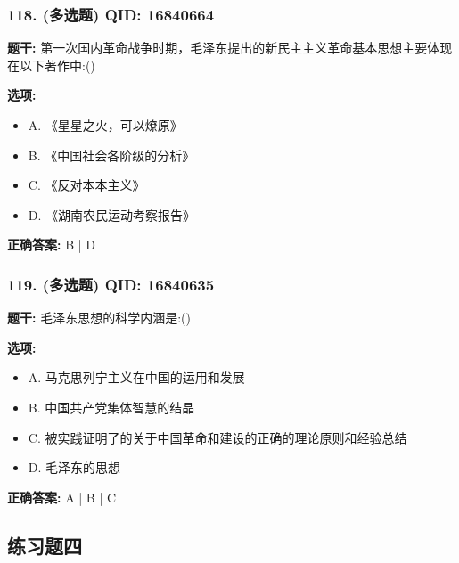 \documentclass[12pt,UTF8]{ctexart}
\begin{document}
\subsubsection*{118. (多选题) \small QID: 16840664}

\textbf{题干:}
第一次国内革命战争时期，毛泽东提出的新民主主义革命基本思想主要体现在以下著作中:()

\textbf{选项:}
\begin{itemize}[leftmargin=*]

  \item A. 《星星之火，可以燎原》

  \item B. 《中国社会各阶级的分析》

  \item C. 《反对本本主义》

  \item D. 《湖南农民运动考察报告》

\end{itemize}

\textbf{正确答案:}
B | D

\vspace{0.3em}\hrulefill\vspace{0.7em}

\subsubsection*{119. (多选题) \small QID: 16840635}

\textbf{题干:}
毛泽东思想的科学内涵是:()

\textbf{选项:}
\begin{itemize}[leftmargin=*]

  \item A. 马克思列宁主义在中国的运用和发展

  \item B. 中国共产党集体智慧的结晶

  \item C. 被实践证明了的关于中国革命和建设的正确的理论原则和经验总结

  \item D. 毛泽东的思想

\end{itemize}

\textbf{正确答案:}
A | B | C

\vspace{0.3em}\hrulefill\vspace{0.7em}

\subsection*{练习题四}
\end{document}
